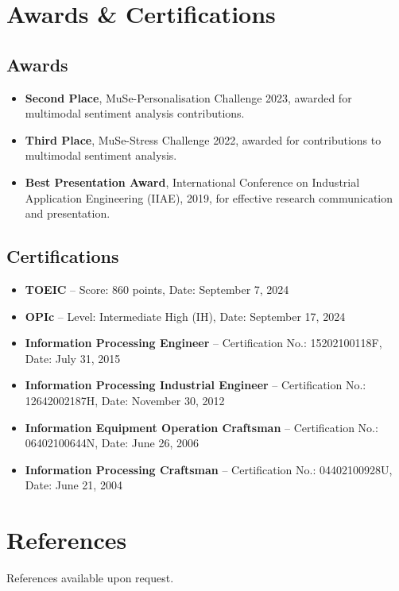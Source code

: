 \documentclass[11pt]{article}
\begin{document}
\section{Awards \& Certifications}
\subsection{Awards}
\begin{itemize}
    \item[\checkmark] \textbf{Second Place}, MuSe-Personalisation Challenge 2023, awarded for multimodal sentiment analysis contributions.
    \item[\checkmark] \textbf{Third Place}, MuSe-Stress Challenge 2022, awarded for contributions to multimodal sentiment analysis.
    \item[\checkmark] \textbf{Best Presentation Award}, International Conference on Industrial Application Engineering (IIAE), 2019, for effective research communication and presentation.
\end{itemize}

\subsection{Certifications}
\begin{itemize}
    \item[\checkmark] \textbf{TOEIC} – Score: 860 points, Date: September 7, 2024
    \item[\checkmark] \textbf{OPIc} – Level: Intermediate High (IH), Date: September 17, 2024
    \item[\checkmark] \textbf{Information Processing Engineer} – Certification No.: 15202100118F, Date: July 31, 2015
    \item[\checkmark] \textbf{Information Processing Industrial Engineer} – Certification No.: 12642002187H, Date: November 30, 2012
    \item[\checkmark] \textbf{Information Equipment Operation Craftsman} – Certification No.: 06402100644N, Date: June 26, 2006
    \item[\checkmark] \textbf{Information Processing Craftsman} – Certification No.: 04402100928U, Date: June 21, 2004
\end{itemize}

\section{References}
\textcolor{Sepia}{References available upon request.}
\end{document}
